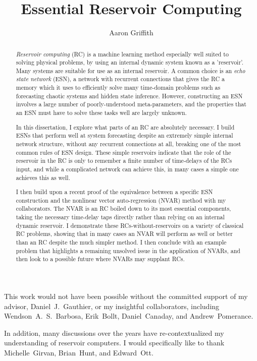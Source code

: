 \documentclass[11pt,draft,phd]{osudiss-2}
\title{Essential Reservoir Computing}
\author{Aaron Griffith}
\begin{document}
\frontmatter

\begin{abstract}

  \emph{Reservoir computing} (RC) is a machine learning method
  especially well suited to solving physical problems, by using an
  internal dynamic system known as a 'reservoir'. Many systems are
  suitable for use as an internal reservoir. A common choice is an
  \emph{echo state network} (ESN), a network with recurrent
  connections that gives the RC a memory which it uses to efficiently
  solve many time-domain problems such as forecasting chaotic systems
  and hidden state inference. However, constructing an ESN involves a
  large number of poorly-understood meta-parameters, and the properties
  that an ESN must have to solve these tasks well are largely unknown.

  In this dissertation, I explore what parts of an RC are absolutely
  necessary. I build ESNs that perform well at system forecasting
  despite an extremely simple internal network structure, without any
  recurrent connections at all, breaking one of the most common rules
  of ESN design. These simple reservoirs indicate that the role of the
  reservoir in the RC is only to remember a finite number of
  time-delays of the RCs input, and while a complicated network can
  achieve this, in many cases a simple one achieves this as well.

  I then build upon a recent proof of the equivalence between a
  specific ESN construction and the nonlinear vector auto-regression
  (NVAR) method with my collaborators. The NVAR is an RC boiled down
  to its most essential components, taking the necessary time-delay
  taps directly rather than relying on an internal dynamic
  reservoir. I demonstrate these RCs-without-reservoirs on a variety
  of classical RC problems, showing that in many cases an NVAR will
  perform as well or better than an RC despite the much simpler
  method. I then conclude with an example problem that highlights a
  remaining unsolved issue in the application of NVARs, and then look
  to a possible future where NVARs may supplant RCs.
\end{abstract}

\dedication{For my brother Nathan, and my parents Gregory and Mary Lea.}

\begin{acknowledgments}
  This work would not have been possible without the committed support
  of my advisor, Daniel~J.~Gauthier, or my insightful collaborators,
  including Wendson~A.~S.~Barbosa, Erik~Bollt, Daniel~Canaday, and Andrew~Pomerance.

  In addition, many discussions over the years have
  re-contextualized my understanding of reservoir computers. I would
  specifically like to thank Michelle~Girvan, Brian~Hunt, and Edward~Ott.
\end{acknowledgments}
\end{document}
